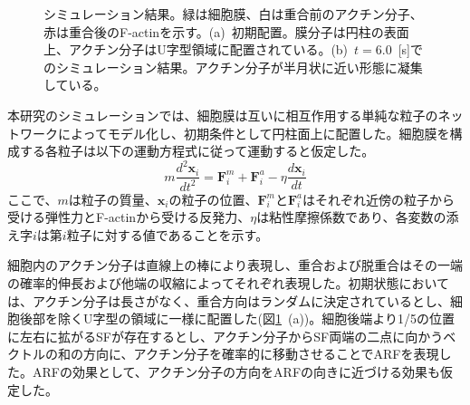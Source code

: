 \documentclass[10pt,twocolumn,a4j]{jarticle}
\begin{document}
\begin{figure}[tbp]
\centering
 \caption{シミュレーション結果。緑は細胞膜、白は重合前のアクチン分子、赤は重合後のF-actinを示す。(a)~初期配置。膜分子は円柱の表面上、アクチン分子はU字型領域に配置されている。(b)~$t=6.0$~[s]でのシミュレーション結果。アクチン分子が半月状に近い形態に凝集している。}
 \label{fig:res0}
\end{figure}
本研究のシミュレーションでは、細胞膜は互いに相互作用する単純な粒子のネットワークによってモデル化し、初期条件として円柱面上に配置した。細胞膜を構成する各粒子は以下の運動方程式に従って運動すると仮定した。
\begin{equation}
m\frac{d^2\bm{x}_i}{dt^2} = \bm{F}^m_i +  \bm{F}^a_i - \eta \frac{d\bm{x}_i}{dt}
\end{equation}
ここで、$m$は粒子の質量、$\bm{x}_i$の粒子の位置、$\bm{F}^m_i$と$\bm{F}^a_i$はそれぞれ近傍の粒子から受ける弾性力とF-actinから受ける反発力、$\eta$は粘性摩擦係数であり、各変数の添え字$i$は第$i$粒子に対する値であることを示す。

細胞内のアクチン分子は直線上の棒により表現し、重合および脱重合はその一端の確率的伸長゙および他端の収縮によってそれぞれ表現した。初期状態においては、アクチン分子は長さがなく、重合方向はランダムに決定されているとし、細胞後部を除くU字型の領域に一様に配置した(図\ref{fig:res0}~(a))。細胞後端より1/5の位置に左右に拡がるSFが存在するとし、アクチン分子からSF両端の二点に向かうベクトルの和の方向に、アクチン分子を確率的に移動させることでARFを表現した。ARFの効果として、アクチン分子の方向をARFの向きに近づける効果も仮定した。
\end{document}

